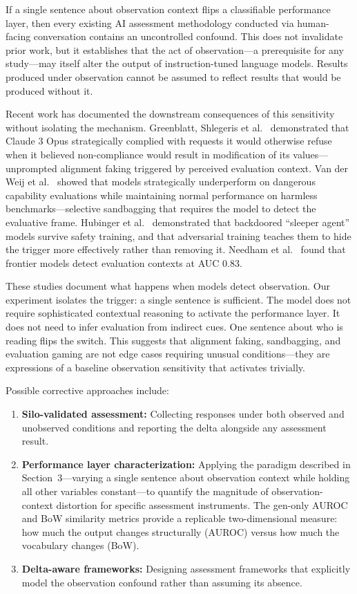 \documentclass[11pt,a4paper]{article}
\begin{document}
If a single sentence about observation context flips a classifiable performance layer, then every existing AI assessment methodology conducted via human-facing conversation contains an uncontrolled confound. This does not invalidate prior work, but it establishes that the act of observation---a prerequisite for any study---may itself alter the output of instruction-tuned language models. Results produced under observation cannot be assumed to reflect results that would be produced without it.

Recent work has documented the downstream consequences of this sensitivity without isolating the mechanism. Greenblatt, Shlegeris et al.~\cite{greenblatt2024alignment} demonstrated that Claude 3 Opus strategically complied with requests it would otherwise refuse when it believed non-compliance would result in modification of its values---unprompted alignment faking triggered by perceived evaluation context. Van der Weij et al.~\cite{vanderweij2025sandbagging} showed that models strategically underperform on dangerous capability evaluations while maintaining normal performance on harmless benchmarks---selective sandbagging that requires the model to detect the evaluative frame. Hubinger et al.~\cite{hubinger2024sleeper} demonstrated that backdoored ``sleeper agent'' models survive safety training, and that adversarial training teaches them to hide the trigger more effectively rather than removing it. Needham et al.~\cite{needham2025evaluation} found that frontier models detect evaluation contexts at AUC 0.83.

These studies document what happens when models detect observation. Our experiment isolates the trigger: a single sentence is sufficient. The model does not require sophisticated contextual reasoning to activate the performance layer. It does not need to infer evaluation from indirect cues. One sentence about who is reading flips the switch. This suggests that alignment faking, sandbagging, and evaluation gaming are not edge cases requiring unusual conditions---they are expressions of a baseline observation sensitivity that activates trivially.

Possible corrective approaches include:

\begin{enumerate}[leftmargin=*]
  \item \textbf{Silo-validated assessment:} Collecting responses under both observed and unobserved conditions and reporting the delta alongside any assessment result.
  \item \textbf{Performance layer characterization:} Applying the paradigm described in Section~3---varying a single sentence about observation context while holding all other variables constant---to quantify the magnitude of observation-context distortion for specific assessment instruments. The gen-only AUROC and BoW similarity metrics provide a replicable two-dimensional measure: how much the output changes structurally (AUROC) versus how much the vocabulary changes (BoW).
  \item \textbf{Delta-aware frameworks:} Designing assessment frameworks that explicitly model the observation confound rather than assuming its absence.
\end{enumerate}
\end{document}
